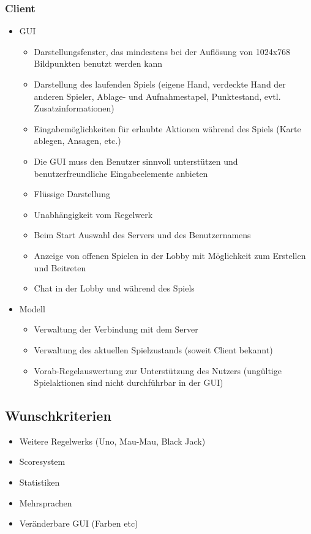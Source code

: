 \documentclass{article}
\begin{document}
\subsubsection{\gls{Client}}
\begin{itemize}
	\item GUI
	\begin{itemize}
		\item Darstellungsfenster, das mindestens bei der Auflösung von 1024x768 Bildpunkten benutzt werden kann
		\item Darstellung des laufenden Spiels (eigene Hand, verdeckte Hand der anderen Spieler, Ablage- und Aufnahmestapel, 			Punktestand, evtl. Zusatzinformationen)
		\item Eingabemöglichkeiten für erlaubte Aktionen während des Spiels (Karte ablegen, Ansagen, etc.)
		\item Die \gls{GUI} muss den Benutzer sinnvoll unterstützen und benutzerfreundliche Eingabeelemente anbieten
		\item Flüssige Darstellung
		\item Unabhängigkeit vom \gls{Regelwerk}
		\item Beim Start Auswahl des \gls{Server}s und des Benutzernamens
		\item Anzeige von offenen Spielen in der \gls{Lobby} mit Möglichkeit zum Erstellen und Beitreten
		\item Chat in der \gls{Lobby} und während des Spiels
	\end{itemize}
	\item Modell
	\begin{itemize}
		\item Verwaltung der Verbindung mit dem \gls{Server}
		\item Verwaltung des aktuellen Spielzustands (soweit \gls{Client} bekannt)
		\item Vorab-Regelauswertung zur Unterstützung des Nutzers (ungültige Spielaktionen sind nicht durchführbar in der 					\gls{GUI})
	\end{itemize}
\end{itemize}

\subsection{Wunschkriterien}
\begin{itemize}
	\item Weitere \glspl{Regelwerk} (Uno, Mau-Mau, Black Jack)
	\item Scoresystem
	\item Statistiken
	\item Mehrsprachen
	\item Veränderbare \gls{GUI} (Farben etc)
\end{itemize}
\end{document}
